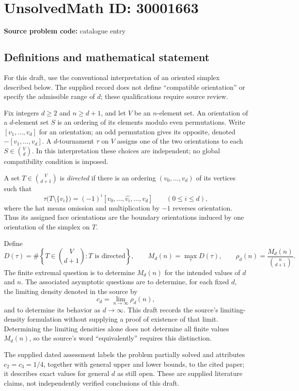 \documentclass[11pt]{article}
\begin{document}
\section*{UnsolvedMath ID: 30001663}
\textbf{Source problem code:} catalogue entry
\subsection{Definitions and mathematical statement}
For this draft, use the conventional interpretation of an oriented simplex described below. The supplied record does not define ``compatible orientation'' or specify the admissible range of \(d\); these qualifications require source review.

Fix integers \(d\geq 2\) and \(n\geq d+1\), and let \(V\) be an \(n\)-element set. An orientation of a \(d\)-element set \(S\) is an ordering of its elements modulo even permutations. Write \([v_1,\ldots,v_d]\) for an orientation; an odd permutation gives its opposite, denoted \(-[v_1,\ldots,v_d]\). A \(d\)-tournament \(\tau\) on \(V\) assigns one of the two orientations to each \(S\in\binom{V}{d}\). In this interpretation these choices are independent; no global compatibility condition is imposed.

A set \(T\in\binom{V}{d+1}\) is \emph{directed} if there is an ordering \((v_0,\ldots,v_d)\) of its vertices such that
\[
\tau\bigl(T\setminus\{v_i\}\bigr)
 =(-1)^i[v_0,\ldots,\widehat{v_i},\ldots,v_d]
\qquad(0\leq i\leq d),
\]
where the hat means omission and multiplication by \(-1\) reverses orientation. Thus its assigned face orientations are the boundary orientations induced by one orientation of the simplex on \(T\).

Define
\[
D(\tau)=\#\left\{T\in\binom{V}{d+1}:T\text{ is directed}\right\},
\qquad
M_d(n)=\max_{\tau}D(\tau),
\qquad
\rho_d(n)=\frac{M_d(n)}{\binom{n}{d+1}}.
\]
The finite extremal question is to determine \(M_d(n)\) for the intended values of \(d\) and \(n\). The associated asymptotic questions are to determine, for each fixed \(d\), the limiting density denoted in the source by
\[
c_d=\lim_{n\to\infty}\rho_d(n),
\]
and to determine its behavior as \(d\to\infty\). This draft records the source's limiting-density formulation without supplying a proof of existence of that limit. Determining the limiting densities alone does not determine all finite values \(M_d(n)\), so the source's word ``equivalently'' requires this distinction.

The supplied dated assessment labels the problem partially solved and attributes \(c_2=c_3=1/4\), together with general upper and lower bounds, to the cited paper; it describes exact values for general \(d\) as still open. These are supplied literature claims, not independently verified conclusions of this draft.
\end{document}
